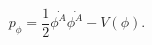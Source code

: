 \begin{equation}
p_\phi =\frac{1}{2}\stackrel{.}{\phi ^A}\stackrel{.}{\phi
^A}-V(\phi ). \label{pre}
\end{equation}

